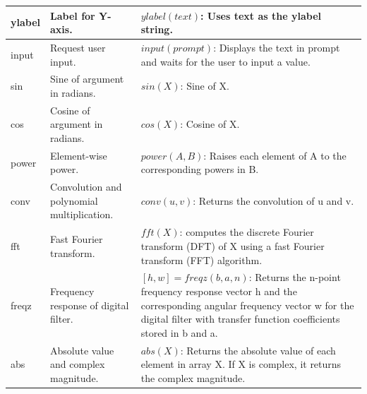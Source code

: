 \documentclass{lab_sheet}
\begin{document}
\begin{table}[H]
\begin{tabular}{||C{3cm}||C{4cm}||C{7.5cm}||}
    ylabel  & Label for Y-axis.                           & $ylabel(text)$: Uses text as the ylabel string.                                                                                                                                                                \\ \hline
    input   & Request user input.                         & $input(prompt)$: Displays the text in prompt and waits for the user to input a value.                                                                                                                  \\ \hline
    sin     & Sine of argument in radians.                & $sin(X)$: Sine of X.                                                                                                                                                                                  \\ \hline
    cos     & Cosine of argument in radians.              & $cos(X)$: Cosine of X.                                                                                                                                                                                 \\ \hline
    power   & Element-wise power.                         & $power(A,B)$: Raises each element of A to the corresponding powers in B.                                                                                                                               \\ \hline
    conv    & Convolution and polynomial multiplication.  & $conv(u,v)$: Returns the convolution of u and v.                                                                                                                                                       \\ \hline
    fft     & Fast Fourier transform.                     & $fft(X)$: computes the discrete Fourier transform (DFT) of X using a fast Fourier transform (FFT) algorithm.                                                                                           \\ \hline
    freqz   & Frequency response of digital filter.       & $[h,w] = freqz(b,a,n)$: Returns the n-point frequency response vector h and the corresponding angular frequency vector w for the digital filter with transfer function coefficients stored in b and a. \\ \hline
    abs     & Absolute value and complex magnitude.       & $abs(X)$: Returns the absolute value of each element in array X. If X is complex, it returns the complex magnitude.                                                                                \\ \hline

\end{tabular}
\end{table}
\end{document}
